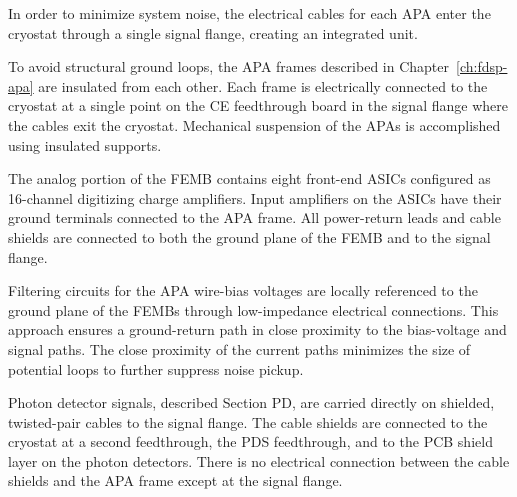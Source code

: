 In order to minimize system noise, the electrical cables for each APA enter the cryostat through a single signal flange, creating an integrated unit.

To avoid structural ground loops, the APA frames described in Chapter~\ref{ch:fdsp-apa} are insulated from each other. Each frame is electrically connected to the cryostat at a single point on the CE feedthrough board in the signal flange where the cables exit the cryostat. Mechanical suspension of the APAs is accomplished using insulated supports. 

The analog portion of the FEMB contains eight front-end ASICs configured as 16-channel digitizing charge amplifiers. Input amplifiers on the ASICs have their ground terminals connected to the APA frame.  All power-return leads and cable shields are connected to both the ground plane of the FEMB and to the signal flange.

Filtering circuits for the APA wire-bias voltages are locally referenced to the ground plane of the FEMBs through low-impedance electrical connections. This approach ensures a ground-return path in close proximity to the bias-voltage and signal paths. The close proximity of the current paths minimizes the size of potential loops to further suppress noise pickup.

Photon detector signals, described Section PD, are carried directly on shielded, twisted-pair cables to the signal flange. The cable shields are connected to the cryostat at a second feedthrough, the PDS feedthrough, and to the PCB shield layer on the photon detectors. There is no electrical connection between the cable shields and the APA frame except at the signal flange.

